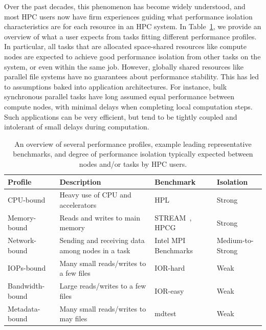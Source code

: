 Over the past decades, this phenomenon has become widely understood, and most HPC users now have firm experiences guiding what performance isolation characteristics are for each resource in an HPC system. In Table~\ref{Table:profiles}, we provide an overview of what a user expects from tasks fitting different performance profiles. In particular, all tasks that are allocated space-shared resources like compute nodes are expected to achieve good performance isolation from other tasks on the system, or even within the same job. However, globally shared resources like parallel file systems have no guarantees about performance stability. This has led to assumptions baked into application architectures. For instance, bulk synchronous parallel tasks have long assumed equal performance between compute nodes, with minimal delays when completing local computation steps. Such applications can be very efficient, but tend to be tightly coupled and intolerant of small delays during computation.

\begin{table}
  \caption{An overview of several performance profiles, example leading representative benchmarks, and degree of performance isolation typically expected between nodes and/or tasks by HPC users.}
  \label{Table:profiles}
  \begin{center}
\begin{tabular}{|l|l|l|l|}
\hline
{\bf Profile} & {\bf Description} & {\bf Benchmark} & {\bf Isolation} \\
\hline
CPU-bound & Heavy use of CPU and accelerators & HPL~\cite{hpl} & Strong\\
\hline
Memory-bound & Reads and writes to main memory & \raggedright STREAM~\cite{stream}, HPCG~\cite{hpcg} & Strong\\
\hline
Network-bound & Sending and receiving data among nodes in a task & \raggedright Intel MPI Benchmarks~\cite{imb} & Medium-to-Strong\\
\hline
IOPs-bound & Many small reads/writes to a few files & IOR-hard~\cite{io500} & Weak\\
\hline
Bandwidth-bound & Large reads/writes to a few files & IOR-easy~\cite{io500} & Weak\\
\hline
Metadata-bound & Many small reads/writes to may files & mdtest~\cite{ior} & Weak \\
\hline
\end{tabular}
\end{center}
\end{table}

